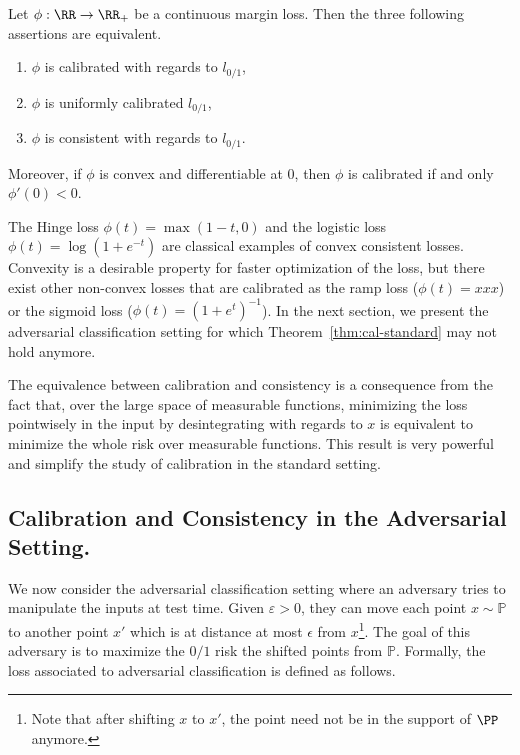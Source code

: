 \begin{thm}
\label{thm:cal-standard}
Let $\phi:\RR\to\RR_+$ be  a continuous margin loss. Then the three following assertions are equivalent.
    \begin{enumerate}
    \item $\phi$ is calibrated with regards to $l_{0/1}$,
    \item $\phi$ is uniformly calibrated $l_{0/1}$,
    \item $\phi$ is consistent with regards to $l_{0/1}$.
    \end{enumerate} 
Moreover, if $\phi$ is convex and differentiable at $0$, then $\phi$ is calibrated if and only $\phi'(0)<0$.
\end{thm}


The Hinge loss $\phi(t) = \max (1-t,0)$ and the logistic loss $\phi(t) = \log(1+e^{-t})$ are classical examples of convex consistent losses. Convexity is a desirable property for faster optimization of the loss, but there exist other non-convex losses that are calibrated as the ramp loss ($\phi(t) = xxx$) or the sigmoid loss ($\phi(t) = (1+e^t)^{-1}$). In the next section, we present the adversarial classification setting for which Theorem~\ref{thm:cal-standard} may not hold anymore. 



\begin{rmq}
The equivalence between calibration and consistency is a consequence from the fact that, over the large space of measurable functions, minimizing the loss pointwisely in the input by desintegrating with regards to $x$ is equivalent to minimize the whole risk over measurable functions. This result is very powerful and simplify the study of calibration in the standard setting. 
\end{rmq}



\subsection{Calibration and Consistency in the Adversarial Setting.}


We now consider the adversarial classification setting where an adversary tries to manipulate the inputs at test time. Given  $\varepsilon>0$, they can move each point $x \sim \mathbb{P}$ to another point $x'$ which is at distance at most $\epsilon$ from $x$\footnote{Note that after shifting $x$ to $x'$, the point need not be in the support of $\PP$ anymore.}. The goal of this adversary is to maximize the $0/1$ risk the shifted points from $\mathbb{P}$. Formally, the loss associated to adversarial classification is defined as follows.

